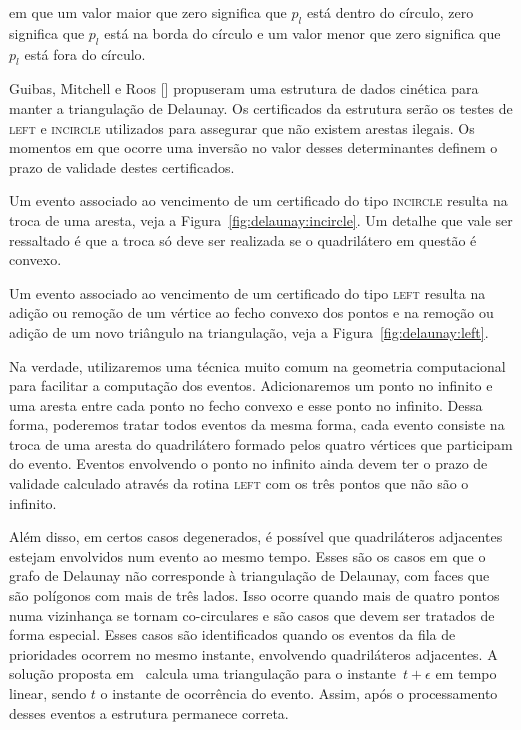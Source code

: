em que um valor maior que zero significa que $p_l$ está dentro do círculo, zero significa que $p_l$
está na borda do círculo e um valor menor que zero significa que $p_l$ está fora do círculo.

Guibas, Mitchell e Roos [\cite{guibas-mitchell-roos}] propuseram uma estrutura de dados cinética
para manter a triangulação de Delaunay.
Os certificados da estrutura serão os testes de \textsc{left} e \textsc{incircle} utilizados para
assegurar que não existem arestas ilegais.
Os momentos em que ocorre uma inversão no valor desses determinantes definem o prazo de validade
destes certificados.

Um evento associado ao vencimento de um certificado do tipo \textsc{incircle} resulta na troca de
uma aresta, veja a Figura~\ref{fig:delaunay:incircle}.
Um detalhe que vale ser ressaltado é que a troca só deve ser realizada se o quadrilátero em
questão é convexo.

Um evento associado ao vencimento de um certificado do tipo \textsc{left} resulta na adição ou
remoção de um vértice ao fecho convexo dos pontos e na remoção ou adição de um novo triângulo na
triangulação, veja a Figura~\ref{fig:delaunay:left}.

Na verdade, utilizaremos uma técnica muito comum na geometria computacional para facilitar a
computação dos eventos.
Adicionaremos um ponto no infinito e uma aresta entre cada ponto no fecho convexo e esse ponto no
infinito.
Dessa forma, poderemos tratar todos eventos da mesma forma, cada evento consiste na troca de uma
aresta do quadrilátero formado pelos quatro vértices que participam do evento.
Eventos envolvendo o ponto no infinito ainda devem ter o prazo de validade
calculado através da rotina \textsc{left} com os três pontos que não são o infinito.

Além disso, em certos casos degenerados, é possível que quadriláteros adjacentes estejam
envolvidos num evento ao mesmo tempo.
Esses são os casos em que o grafo de Delaunay não corresponde à triangulação de Delaunay, com
faces que são polígonos com mais de três lados.
Isso ocorre quando mais de quatro pontos numa vizinhança se tornam co-circulares e são casos que
devem ser tratados de forma especial.
Esses casos são identificados quando os eventos da fila de prioridades ocorrem no mesmo instante,
envolvendo quadriláteros adjacentes.
A solução proposta em~\cite{aggarwal-guibas-saxe-shor} calcula uma triangulação para o
instante~$t + \epsilon$ em tempo linear, sendo $t$ o instante de ocorrência do evento.
Assim, após o processamento desses eventos a estrutura permanece correta.

